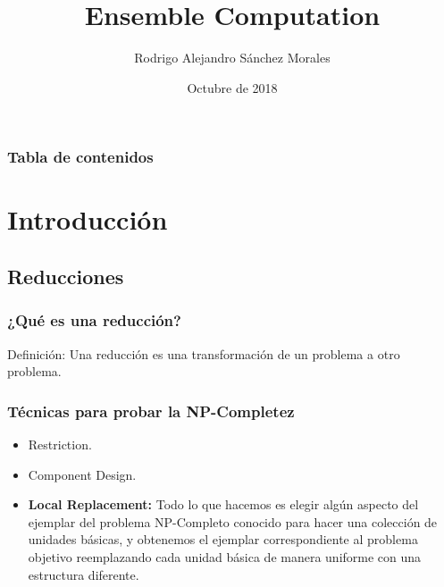 \documentclass{beamer}
\title[Ensemble Computation]{Ensemble Computation} %
\author{Rodrigo Alejandro Sánchez Morales} %
\institute[UNAM] %
{
\makebox[0pt][r]{\raisebox{-\totalheight}[0pt][0pt]{\texttt{[image: ciencias]}}}
Universidad Nacional Autónoma de México \\ %
Facultad de Ciencias \\
\medskip
\textit{Complejidad Computacional, 2019-I} %
}
\date{Octubre de 2018} %
\begin{document}
\begin{frame}
\titlepage %
\end{frame}

\begin{frame}
\frametitle{Tabla de contenidos} %
\tableofcontents %
\end{frame}


\section{Introducción} %

\subsection{Reducciones} %

\begin{frame}
\frametitle{¿Qué es una reducción?}
\begin{block}{Definición:}
Una reducción es una transformación de un problema a otro problema.
\end{block}
\end{frame}


\begin{frame}
\frametitle{Técnicas para probar la NP-Completez}
    \begin{itemize}
        \item Restriction.
        \item Component Design.
        \item \textbf{Local Replacement:} Todo lo que hacemos es elegir algún aspecto del ejemplar del problema NP-Completo conocido para hacer una colección de unidades básicas, y obtenemos el ejemplar correspondiente al problema objetivo reemplazando cada unidad básica de manera uniforme con una estructura diferente.
    \end{itemize}
\end{frame}
\end{document}
